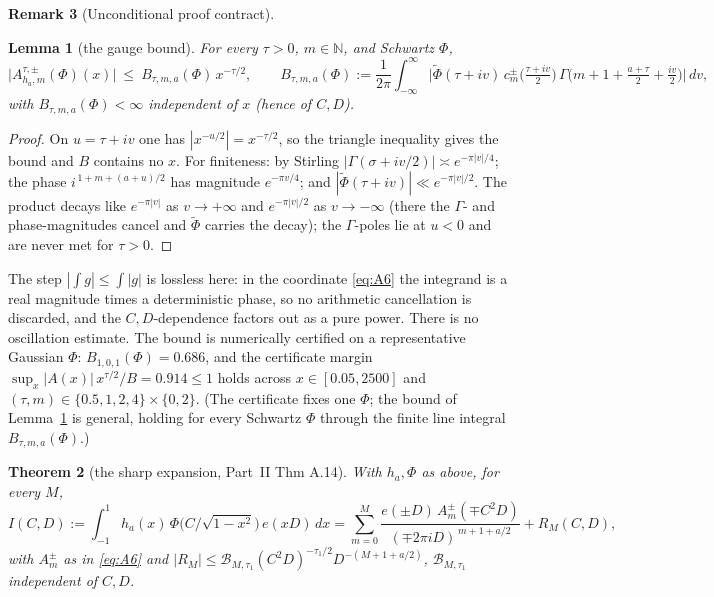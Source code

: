 \documentclass[11pt]{article}
\newtheorem{theorem}{Theorem}
\newtheorem{lemma}[theorem]{Lemma}
\theoremstyle{definition}
\newtheorem{remark}[theorem]{Remark}
\newcommand{\wt}[1]{\widetilde{#1}}
\begin{document}
\begin{remark}[Unconditional proof contract]
\begin{enumerate}
\begin{lemma}[the gauge bound]\label{lem:mag}
For every $\tau>0$, $m\in\mathbb N$, and Schwartz $\Phi$,
\[
  \big|A^{\tau,\pm}_{h_a,m}(\Phi)(x)\big|\ \le\ B_{\tau,m,a}(\Phi)\,x^{-\tau/2},
  \qquad
  B_{\tau,m,a}(\Phi):=\frac{1}{2\pi}\!\int_{-\infty}^{\infty}\!
     \Big|\wt\Phi(\tau+iv)\,c^\pm_m\!\big(\tfrac{\tau+iv}{2}\big)\,
     \Gamma\!\big(m{+}1{+}\tfrac{a+\tau}{2}{+}\tfrac{iv}{2}\big)\Big|\,dv,
\]
with $B_{\tau,m,a}(\Phi)<\infty$ \emph{independent of $x$} (hence of $C,D$).
\end{lemma}

\begin{proof}
On $u=\tau+iv$ one has $|x^{-u/2}|=x^{-\tau/2}$, so the triangle inequality gives the bound and $B$
contains no $x$. For finiteness: by Stirling $|\Gamma(\sigma+iv/2)|\asymp e^{-\pi|v|/4}$; the phase
$i^{\,1+m+(a+u)/2}$ has magnitude $e^{-\pi v/4}$; and $|\wt\Phi(\tau+iv)|\ll e^{-\pi|v|/2}$. The
product decays like $e^{-\pi|v|}$ as $v\to+\infty$ and $e^{-\pi|v|/2}$ as $v\to-\infty$ (there the
$\Gamma$- and phase-magnitudes cancel and $\wt\Phi$ carries the decay); the $\Gamma$-poles lie at
$u<0$ and are never met for $\tau>0$.
\end{proof}

The step $|\int g|\le\int|g|$ is lossless here: in the coordinate \eqref{eq:A6} the integrand is a
real magnitude times a deterministic phase, so no arithmetic cancellation is discarded, and the
$C,D$-dependence factors out as a pure power. There is no oscillation estimate. The bound is
numerically certified on a representative Gaussian $\Phi$: $B_{1,0,1}(\Phi)=0.686$, and the certificate
margin $\sup_x |A(x)|\,x^{\tau/2}/B=0.914\le1$ holds across $x\in[0.05,2500]$ and
$(\tau,m)\in\{0.5,1,2,4\}\times\{0,2\}$. (The certificate fixes one $\Phi$; the bound of
Lemma~\ref{lem:mag} is general, holding for every Schwartz $\Phi$ through the finite line integral
$B_{\tau,m,a}(\Phi)$.)

\begin{theorem}[the sharp expansion, Part~II Thm A.14]\label{thm:A14}
With $h_a,\Phi$ as above, for every $M$,
\[
  I(C,D):=\int_{-1}^{1}h_a(x)\,\Phi\!\big(C/\sqrt{1-x^2}\big)\,e(xD)\,dx
  =\sum_{m=0}^{M}\frac{e(\pm D)\,A^{\pm}_m(\mp C^2D)}{(\mp 2\pi iD)^{\,m+1+a/2}}+R_M(C,D),
\]
with $A^\pm_m$ as in \eqref{eq:A6} and $|R_M|\le\mathcal B_{M,\tau_1}(C^2D)^{-\tau_1/2}
D^{-(M+1+a/2)}$, $\mathcal B_{M,\tau_1}$ independent of $C,D$.
\end{theorem}


\end{enumerate}
\end{remark}
\end{document}
